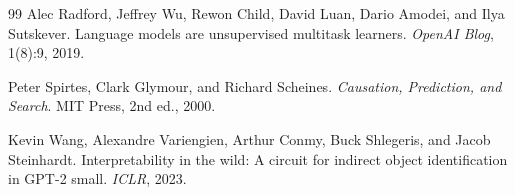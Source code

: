 \documentclass{article}
\begin{document}
\begin{thebibliography}{99}
Alec Radford, Jeffrey Wu, Rewon Child, David Luan, Dario Amodei, and Ilya Sutskever.
\newblock Language models are unsupervised multitask learners.
\newblock \emph{OpenAI Blog}, 1(8):9, 2019.

Peter Spirtes, Clark Glymour, and Richard Scheines.
\newblock \emph{Causation, Prediction, and Search}.
\newblock MIT Press, 2nd ed., 2000.

Kevin Wang, Alexandre Variengien, Arthur Conmy, Buck Shlegeris,
and Jacob Steinhardt.
\newblock Interpretability in the wild: A circuit for indirect object
identification in GPT-2 small.
\newblock \emph{ICLR}, 2023.

\end{thebibliography}
\end{document}
